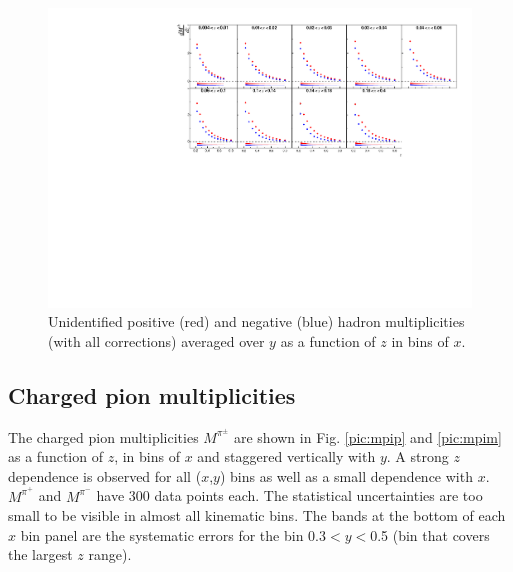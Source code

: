 \begin{figure}[!h]
  \centering
	\includegraphics[scale=0.85]{./gfx/hyavg.pdf}
	\caption{Unidentified positive (red) and negative (blue) hadron multiplicities (with all corrections) averaged over $y$ as a function of $z$ in bins of $x$.}
	\label{pic:mhyavg}
\end{figure}

\newpage

\subsection{Charged pion multiplicities}

The charged pion multiplicities $M^{\pi^{\pm}}$ are shown in Fig. \ref{pic:mpip} and \ref{pic:mpim} as a  function of $z$, in bins of $x$ and staggered vertically with $y$. A strong $z$ dependence is observed for all ($x$,$y$) bins as well as a small dependence with $x$. $M^{\pi^+}$ and $M^{\pi^-}$ have 300 data points each. The statistical uncertainties are too small to be visible in almost all kinematic bins. The bands at the bottom of each $x$ bin panel are the systematic errors for the bin 0.3$< y <$0.5 (bin that covers the largest $z$ range).

